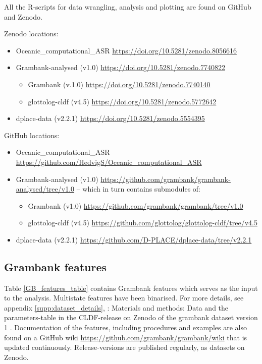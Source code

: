 \documentclass[12pt,letterpaper]{article}
\begin{document}
All the R-scripts for data wrangling, analysis and plotting are found on GitHub and Zenodo.

Zenodo locations:

\begin{itemize}
\item Oceanic\_computational\_ASR  \url{https://doi.org/10.5281/zenodo.8056616}
\item Grambank-analysed (v1.0) \url{https://doi.org/10.5281/zenodo.7740822}
\begin{itemize}
\item Grambank (v.1.0) \url{https://doi.org/10.5281/zenodo.7740140}
\item glottolog-cldf (v4.5) \url{https://doi.org/10.5281/zenodo.5772642}
\end{itemize}
\item dplace-data (v2.2.1) \url{https://doi.org/10.5281/zenodo.5554395}
\end{itemize}

GitHub locations:
\begin{itemize}
\item Oceanic\_computational\_ASR \url{https://github.com/HedvigS/Oceanic_computational_ASR}
\item Grambank-analysed (v1.0) \url{https://github.com/grambank/grambank-analysed/tree/v1.0} -- which in turn contains submodules of:
\begin{itemize}
\item Grambank (v1.0) \url{https://github.com/grambank/grambank/tree/v1.0}
\item glottolog-cldf (v4.5) \url{https://github.com/glottolog/glottolog-cldf/tree/v4.5}
\end{itemize}
\item dplace-data (v2.2.1) \url{https://github.com/D-PLACE/dplace-data/tree/v2.2.1}
\end{itemize}



\subsection{Grambank features}
\label{Grambank_features}
Table \ref{GB_features_table} contains Grambank features which serves as the input to the analysis. Multistate features have been binarised. For more details, see appendix \ref{supp:dataset_details}, \citet{grambank_release}: Materials and methods: Data and the parameters-table in the CLDF-release on Zenodo of the grambank dataset version 1 \citep{grambank_dataset_zenodo_v1}. Documentation of the features, including procedures and examples are also found on a GitHub wiki  \url{https://github.com/grambank/grambank/wiki} that is updated continuously. Release-versions are published regularly, as datasets on Zenodo.
\end{document}
